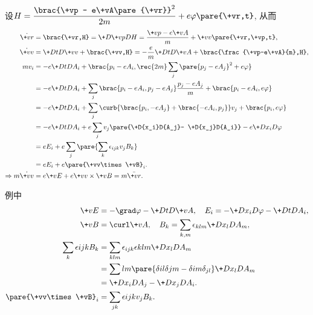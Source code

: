 \documentclass{ctexart}
\begin{document}
\begin{sample}
    \begin{ex}
        设$\displaystyle H = \frac{\brac{\+vp - e\+vA\pare{\+vr}}^2}{2m} + e\varphi\pare{\+vr,t}$, 从而
        \begin{align*}
            \dot{\+vr} &= \brac{\+vr,H} = \+D{\+vp}D{} H = \frac{\+vp-e\+vA}{m} + \+vv\pare{\+vr,\+vp,t}, \\
            \dot{\+vv} &= \+DtD{\+vv} + \brac{\+vv,H} = -\frac{e}{m}\+DtD{\+vA} + \brac{\frac{\+vp-e\+vA}{m},H}, \\
            mv_i &= -e\+DtD{A_i} + \brac{p_i - eA_i, \rec{2m}\sum_j \pare{p_j - eA_j}^2 + e\varphi} \\
            &= -e\+DtD{A_i} + \sum_j \brac{p_i - eA_i,p_j - eA_j}\frac{p_j - eA_j}{m} + \brac{p_i - eA_i, e\varphi} \\
            &= -e\+DtD{A_i} + \sum_j \curb{\brac{p_i,-eA_j} + \brac{-eA_i,p_j}}v_j + \brac{p_i,e\varphi} \\
            &= -e\+DtD{A_i} + e\sum_j v_j \pare{\+D{x_i}D{A_j}- \+D{x_j}D{A_i}} - e\+D{x_i}D{\varphi} \\
            &= e E_i + e\sum_j\pare{\sum_k \epsilon_{ijk} v_jB_k} \\
            &= e E_i + e\pare{\+vv\times\+vB}_i. \\
            \Rightarrow m\dot{\+vv} &= e\+vE + e\+vv\times\+vB = m\ddot{\+vr}.
        \end{align*}
    \end{ex}
\end{sample}
\begin{remark}
    例中
    \begin{align*}
        \+vE &= -\grad\varphi - \+DtD{\+vA},\quad E_i = -\+D{x_i}D{\varphi} - \+DtD{A_i}, \\
        \+vB &= \curl \+vA,\quad B_k = \sum_{k,m}\epsilon_{klm}\+D{x_l}D{} A_m, \\
        \sum_k \epsilon{ijk}B_k &= \sum_{klm} \epsilon_{ijk}\epsilon{klm}\+D{x_l}D{}A_m \\
        &= \sum{lm}\pare{\delta{il}\delta{jm} - \delta{im}\delta_{jl}} \+D{x_l}D{}A_m \\
        &= \+D{x_i}D{A_j} - \+D{x_j}D{A_i}. \\
        \pare{\+vv\times\+vB}_i &= \sum_{jk}\epsilon{ijk} v_j B_k.
    \end{align*}
\end{remark}

\end{document}
